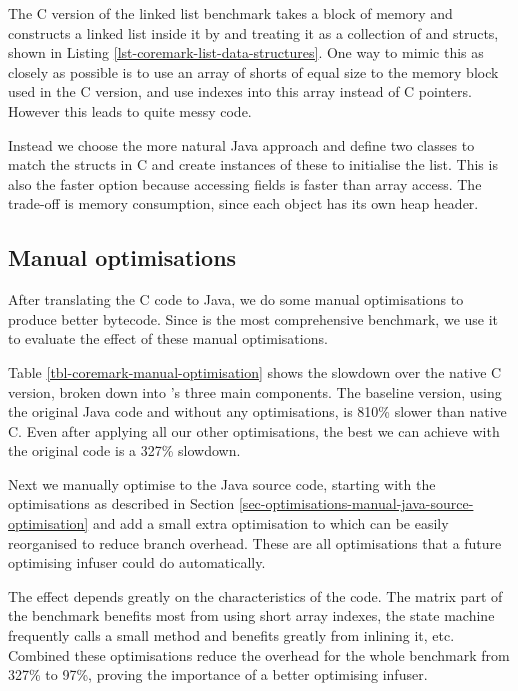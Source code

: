 The C version of the linked list benchmark takes a block of memory and constructs a linked list inside it by and treating it as a collection of  and  structs, shown in Listing \ref{lst-coremark-list-data-structures}. One way to mimic this as closely as possible is to use an array of shorts of equal size to the memory block used in the C version, and use indexes into this array instead of C pointers. However this leads to quite messy code.

Instead we choose the more natural Java approach and define two classes to match the structs in C and create instances of these to initialise the list. This is also the faster option because accessing fields is faster than array access. The trade-off is memory consumption, since each object has its own heap header.


\subsection{Manual optimisations}
\label{sec-evaluation-manual-optimisations}
After translating the C code to Java, we do some manual optimisations to produce better bytecode. Since  is the most comprehensive benchmark, we use it to evaluate the effect of these manual optimisations.



Table \ref{tbl-coremark-manual-optimisation} shows the slowdown over the native C version, broken down into 's three main components. The baseline version, using the original Java code and without any optimisations, is 810\% slower than native C. Even after applying all our other optimisations, the best we can achieve with the original code is a 327\% slowdown.

Next we manually optimise to the Java source code, starting with the optimisations as described in Section \ref{sec-optimisations-manual-java-source-optimisation} and add a small extra optimisation to  which can be easily reorganised to reduce branch overhead. These are all optimisations that a future optimising infuser could do automatically.

The effect depends greatly on the characteristics of the code. The matrix part of the benchmark benefits most from using short array indexes, the state machine frequently calls a small method and benefits greatly from inlining it, etc. Combined these optimisations reduce the overhead for the whole benchmark from 327\% to 97\%, proving the importance of a better optimising infuser.

